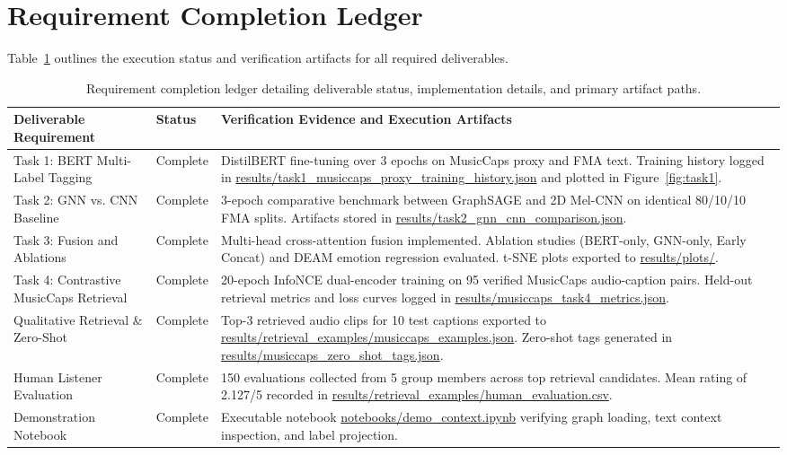 \documentclass[10pt,twocolumn]{article}
\newcommand{\filepath}[1]{\begingroup\urlstyle{tt}\url{#1}\endgroup}
\begin{document}
\section{Requirement Completion Ledger}
Table~\ref{tab:ledger} outlines the execution status and verification artifacts for all required deliverables.

\begin{table}[htbp!]
\centering
\caption{Requirement completion ledger detailing deliverable status, implementation details, and primary artifact paths.}
\label{tab:ledger}
\small
\begin{tabularx}{\textwidth}{p{}p{}X}
\toprule
\textbf{Deliverable Requirement} & \textbf{Status} & \textbf{Verification Evidence and Execution Artifacts} \\
\midrule
Task 1: BERT Multi-Label Tagging & Complete & DistilBERT fine-tuning over 3 epochs on MusicCaps proxy and FMA text. Training history logged in \filepath{results/task1_musiccaps_proxy_training_history.json} and plotted in Figure~\ref{fig:task1}. \\
Task 2: GNN vs. CNN Baseline & Complete & 3-epoch comparative benchmark between GraphSAGE and 2D Mel-CNN on identical 80/10/10 FMA splits. Artifacts stored in \filepath{results/task2_gnn_cnn_comparison.json}. \\
Task 3: Fusion and Ablations & Complete & Multi-head cross-attention fusion implemented. Ablation studies (BERT-only, GNN-only, Early Concat) and DEAM emotion regression evaluated. t-SNE plots exported to \filepath{results/plots/}. \\
Task 4: Contrastive MusicCaps Retrieval & Complete & 20-epoch InfoNCE dual-encoder training on 95 verified MusicCaps audio-caption pairs. Held-out retrieval metrics and loss curves logged in \filepath{results/musiccaps_task4_metrics.json}. \\
Qualitative Retrieval \& Zero-Shot & Complete & Top-3 retrieved audio clips for 10 test captions exported to \filepath{results/retrieval_examples/musiccaps_examples.json}. Zero-shot tags generated in \filepath{results/musiccaps_zero_shot_tags.json}. \\
Human Listener Evaluation & Complete & 150 evaluations collected from 5 group members across top retrieval candidates. Mean rating of 2.127/5 recorded in \filepath{results/retrieval_examples/human_evaluation.csv}. \\
Demonstration Notebook & Complete & Executable notebook \filepath{notebooks/demo_context.ipynb} verifying graph loading, text context inspection, and label projection. \\
\bottomrule
\end{tabularx}
\end{table}
\end{document}
